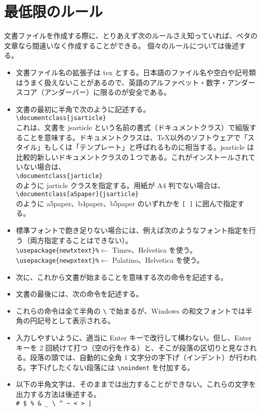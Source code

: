 \section{最低限のルール}
文書ファイルを作成する際に、とりあえず次のルールさえ知っていれば、ベタの文章なら間違いなく作成することができる。
個々のルールについては後述する。
\begin{itemize}\setlength{\leftskip}{-1.00zw}%
\item 文書ファイル名の拡張子は tex とする。日本語のファイル名や空白や記号類はうまく扱えないことがあるので、英語のアルファベット・数字・アンダースコア（アンダーバー）に限るのが安全である。
\item 文書の最初に半角で次のように記述する。\\ \verb'\documentclass{jsarticle}'\\ これは、文書を jsarticle という名前の書式（ドキュメントクラス）で組版することを意味する。ドキュメントクラスは、\TeX{}以外のソフトウェアで「スタイル」もしくは「テンプレート」と呼ばれるものに相当する。jsarticle は比較的新しいドキュメントクラスの１つである。これがインストールされていない場合は、\\ \verb'\documentclass{jarticle}'\\ のように jarticle クラスを指定する。用紙が A4 判でない場合は、\\  \verb'\documentclass[a5paper]{jsarticle}'\\ のように a5paper、b4paper、b5paper のいずれかを \verb'[ ]' に囲んで指定する。
\item 標準フォントで飽き足りない場合には、例えば次のようなフォント指定を行う（両方指定することはできない）。\\  \verb'\usepackage{newtxtext}'\hspc{+10.0pt}\verb'%'\hspc{+10.0pt}$\leftarrow$ Times、\hspc{+7.70pt}Helvetica を使う。\\  \verb'\usepackage{newpxtext}'\hspc{+10.0pt}\verb'%'\hspc{+10.0pt}$\leftarrow$ Palatino、Helvetica を使う。
\item 次に、これから文書が始まることを意味する次の命令を記述する。\\  \verb''
\item 文書の最後には、次の命令を記述する。\\  \verb''
\item これらの命令は全て半角の \verb'\' で始まるが、Windows の和文フォントでは半角の円記号\textyen{}として表示される。\enlargethispage{+0.50zw}
\item 入力しやすいように、適当に Enter キーで改行して構わない。但し、Enter キーを 2 回続けて打つ（空の行を作る）と、そこが段落の区切りと見なされる。段落の頭では、自動的に全角 1 文字分の字下げ（インデント）が行われる。字下げしたくない段落には \verb'\noindent' を付加する。
\item 以下の半角文字は、そのままでは出力することができない。これらの文字を出力する方法は後述する。\\  \verb'# $ % & _ \ ^ ~ < > |'
\end{itemize}
